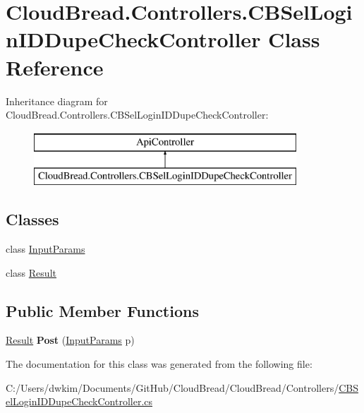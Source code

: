 \hypertarget{class_cloud_bread_1_1_controllers_1_1_c_b_sel_login_i_d_dupe_check_controller}{}\section{Cloud\+Bread.\+Controllers.\+C\+B\+Sel\+Login\+I\+D\+Dupe\+Check\+Controller Class Reference}
\label{class_cloud_bread_1_1_controllers_1_1_c_b_sel_login_i_d_dupe_check_controller}
Inheritance diagram for Cloud\+Bread.\+Controllers.\+C\+B\+Sel\+Login\+I\+D\+Dupe\+Check\+Controller\+:\begin{figure}[H]
\begin{center}
\leavevmode
\includegraphics[height=2.000000cm]{class_cloud_bread_1_1_controllers_1_1_c_b_sel_login_i_d_dupe_check_controller}
\end{center}
\end{figure}
\subsection*{Classes}
\begin{DoxyCompactItemize}
\item 
class \hyperlink{class_cloud_bread_1_1_controllers_1_1_c_b_sel_login_i_d_dupe_check_controller_1_1_input_params}{Input\+Params}
\item 
class \hyperlink{class_cloud_bread_1_1_controllers_1_1_c_b_sel_login_i_d_dupe_check_controller_1_1_result}{Result}
\end{DoxyCompactItemize}
\subsection*{Public Member Functions}
\begin{DoxyCompactItemize}
\item 
\hyperlink{class_cloud_bread_1_1_controllers_1_1_c_b_sel_login_i_d_dupe_check_controller_1_1_result}{Result} {\bfseries Post} (\hyperlink{class_cloud_bread_1_1_controllers_1_1_c_b_sel_login_i_d_dupe_check_controller_1_1_input_params}{Input\+Params} p)\hypertarget{class_cloud_bread_1_1_controllers_1_1_c_b_sel_login_i_d_dupe_check_controller_ae6a1e88ad907f08f710be974100e1f17}{}\label{class_cloud_bread_1_1_controllers_1_1_c_b_sel_login_i_d_dupe_check_controller_ae6a1e88ad907f08f710be974100e1f17}

\end{DoxyCompactItemize}


The documentation for this class was generated from the following file\+:\begin{DoxyCompactItemize}
\item 
C\+:/\+Users/dwkim/\+Documents/\+Git\+Hub/\+Cloud\+Bread/\+Cloud\+Bread/\+Controllers/\hyperlink{_c_b_sel_login_i_d_dupe_check_controller_8cs}{C\+B\+Sel\+Login\+I\+D\+Dupe\+Check\+Controller.\+cs}\end{DoxyCompactItemize}
